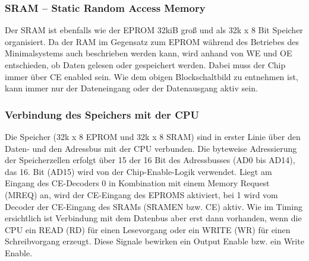 \subsubsection{SRAM -- Static Random Access Memory}

Der SRAM ist ebenfalls wie der EPROM 32kiB groß und als 32k x 8 Bit Speicher organisiert. Da der RAM im Gegensatz zum EPROM während des Betriebes des Minimalsystems auch beschrieben werden kann, wird anhand von WE und OE entschieden, ob Daten gelesen oder gespeichert werden. Dabei muss der Chip immer über CE enabled sein. Wie dem obigen Blockschaltbild zu entnehmen ist, kann immer nur der Dateneingang oder der Datenausgang aktiv sein.

\subsubsection{Verbindung des Speichers mit der CPU}
Die Speicher (32k x 8 EPROM und 32k x 8 SRAM) sind in erster Linie über den Daten- und den Adressbus mit der CPU verbunden. Die byteweise Adressierung der Speicherzellen erfolgt über 15 der 16 Bit des Adressbusses (AD0 bis AD14), das 16. Bit (AD15) wird von der Chip-Enable-Logik verwendet. Liegt am Eingang des CE-Decoders 0 in Kombination mit einem Memory Request (MREQ) an, wird der CE-Eingang des EPROMS aktiviert, bei 1 wird vom Decoder der CE-Eingang des SRAMs (SRAMEN bzw. CE) aktiv. Wie im Timing ersichtlich ist Verbindung mit dem Datenbus aber erst dann vorhanden, wenn die CPU ein READ (RD) für einen Lesevorgang oder ein WRITE (WR) für einen Schreibvorgang erzeugt. Diese Signale bewirken ein Output Enable bzw. ein Write Enable.

